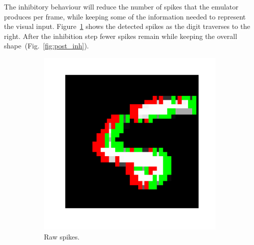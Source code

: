 \documentclass[conference]{IEEEtran}
\begin{document}
The inhibitory behaviour will reduce the number of spikes that the emulator produces per frame, while keeping some of the information needed to represent the visual input. Figure~\ref{fig:pre_inh} shows the detected spikes as the digit traverses to the right. After the inhibition step fewer spikes remain while keeping the overall shape~(Fig.~\ref{fig:post_inh}). 
\begin{figure}[hbt]
  \captionsetup[subfigure]{justification=centering}
  \centering
  \begin{subfigure}[b]{0.155\textwidth}
    \includegraphics[width=\textwidth,trim={3cm 2cm 2cm 2cm},clip] {inhibitory_behaviour__NORMAL___cycle_00000___frame_00035_}
    \caption{Raw spikes.\\~}
    \label{fig:pre_inh}
  \end{subfigure}
  \begin{subfigure}[b]{0.155\textwidth}

\end{subfigure}
\end{figure}
\end{document}
